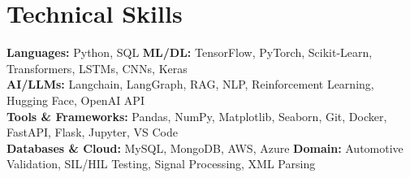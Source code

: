\section{Technical Skills}
    \begin{itemize}[leftmargin=0.15in,  label={}]
	\small{\item{
		\textbf{Languages:} Python, SQL \hfill
            \textbf{ML/DL:} TensorFlow, PyTorch, Scikit-Learn, Transformers, LSTMs, CNNs, Keras \\
            \textbf{AI/LLMs:} Langchain, LangGraph, RAG, NLP, Reinforcement Learning, Hugging Face, OpenAI API \\
            \textbf{Tools \& Frameworks:} Pandas, NumPy, Matplotlib, Seaborn, Git, Docker, FastAPI, Flask, Jupyter, VS Code \\
            \textbf{Databases \& Cloud:} MySQL, MongoDB, AWS, Azure \hfill
            \textbf{Domain:} Automotive Validation, SIL/HIL Testing, Signal Processing, XML Parsing
	}}
    \end{itemize}